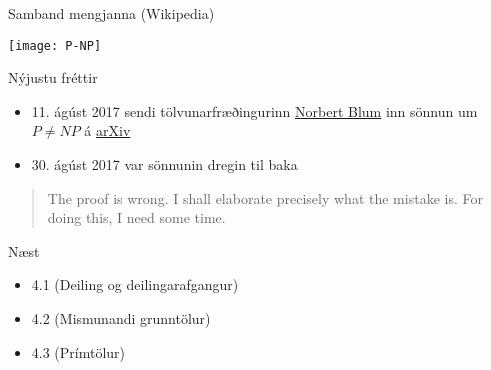 \documentclass[handout]{beamer}
\begin{document}
\begin{frame}{Samband mengjanna (Wikipedia)}
\begin{center}
\texttt{[image: P-NP]}
\end{center}
\end{frame}

\begin{frame}{Nýjustu fréttir}
    \begin{itemize}
        \item 11. ágúst 2017 sendi tölvunarfræðingurinn \href{http://theory.cs.uni-bonn.de/blum/blum.var}{Norbert Blum} inn sönnun um $P \neq NP$ á \href{https://arxiv.org/abs/1708.03486}{arXiv} \pause
        \item 30. ágúst 2017 var sönnunin dregin til baka
    \end{itemize}

    \begin{quote}
        The proof is wrong. I shall elaborate precisely what the mistake is. For doing this, I need some time.
    \end{quote}
\end{frame}

\begin{frame}{Næst}
\begin{itemize}
 \item 4.1 (Deiling og deilingarafgangur)
 \item 4.2 (Mismunandi grunntölur)
 \item 4.3 (Prímtölur)
\end{itemize}
\end{frame}
\end{document}
